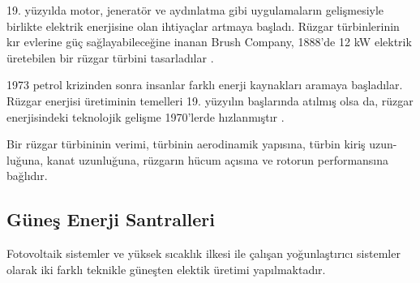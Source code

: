 19. yüzyılda motor, jeneratör ve aydınlatma gibi uygulamaların gelişmesiyle birlikte elektrik enerjisine olan ihtiyaçlar artmaya başladı. Rüzgar türbinlerinin kır evlerine güç sağlayabileceğine inanan Brush Company, 1888'de 12 kW elektrik üretebilen bir rüzgar türbini tasarladılar \cite{veers2019wind}. 

1973 petrol krizinden sonra insanlar farklı enerji kaynakları aramaya başladılar. Rüzgar enerjisi üretiminin temelleri 19. yüzyılın başlarında atılmış olsa da, rüzgar enerjisindeki teknolojik gelişme 1970'lerde hızlanmıştır \cite{KhalilYehia}.

Bir rüzgar türbininin verimi, türbinin aerodinamik yapısına, türbin kiriş uzun-luğuna, kanat uzunluğuna, rüzgarın hücum açısına ve rotorun performansına bağlıdır.


\subsection{Güneş Enerji Santralleri}

Fotovoltaik sistemler ve yüksek sıcaklık ilkesi ile çalışan yoğunlaştırıcı sistemler olarak iki farklı teknikle güneşten elektik üretimi yapılmaktadır. 

